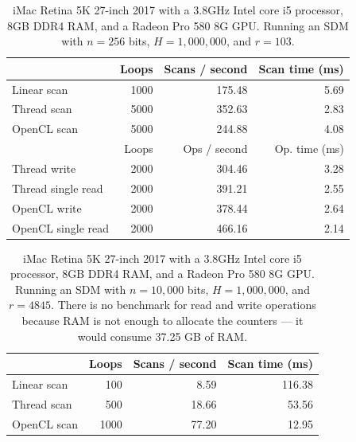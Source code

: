 \begin{table}[!htb]
\centering
\begin{tabular}{| l | r | r | r |}
    \hline
    & Loops & Scans / second & Scan time (ms) \\ \hline
    Linear scan & 1000 & 175.48 & 5.69 \\
    Thread scan & 5000 & 352.63 & 2.83 \\
    OpenCL scan & 5000 & 244.88 & 4.08 \\ \hline
    \hline
    & Loops & Ops / second & Op. time (ms) \\ \hline
    Thread write & 2000 & 304.46 & 3.28 \\
    Thread single read & 2000 & 391.21 & 2.55 \\
    OpenCL write & 2000 & 378.44 & 2.64 \\
    OpenCL single read & 2000 & 466.16 & 2.14 \\
    \hline
\end{tabular}
\caption{iMac Retina 5K 27-inch 2017 with a 3.8GHz Intel core i5 processor, 8GB DDR4 RAM, and a Radeon Pro 580 8G GPU. Running an SDM with $n=256$ bits, $H=1,000,000$, and $r=103$.
\label{tab:perf-imac-256}}
\end{table}

\begin{table}[!htb]
\centering
\begin{tabular}{| l | r | r | r |}
    \hline
    & Loops & Scans / second & Scan time (ms) \\ \hline
    Linear scan & 100 & 8.59 & 116.38 \\
    Thread scan & 500 & 18.66 & 53.56 \\
    OpenCL scan & 1000 & 77.20 & 12.95 \\
    \hline
\end{tabular}
\caption{iMac Retina 5K 27-inch 2017 with a 3.8GHz Intel core i5 processor, 8GB DDR4 RAM, and a Radeon Pro 580 8G GPU. Running an SDM with $n=10,000$ bits, $H=1,000,000$, and $r=4845$.  There is no benchmark for read and write operations because RAM is not enough to allocate the counters --- it would consume 37.25 GB of RAM.
\label{tab:perf-imac-10k}}
\end{table}
